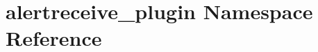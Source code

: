 \hypertarget{namespacealertreceive__plugin}{\section{alertreceive\-\_\-plugin Namespace Reference}
\label{namespacealertreceive__plugin}
}
